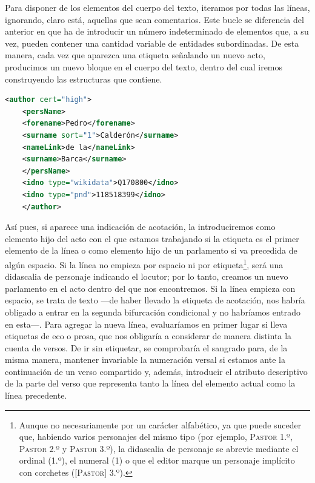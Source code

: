 Para disponer de los elementos del cuerpo del texto, iteramos por todas las líneas, ignorando, claro está, aquellas que sean comentarios. Este bucle se diferencia del anterior en que ha de introducir un número indeterminado de elementos que, a su vez, pueden contener una cantidad variable de entidades subordinadas. De esta manera, cada vez que aparezca una etiqueta señalando un nuevo acto, producimos un nuevo bloque en el cuerpo del texto, dentro del cual iremos construyendo las estructuras que contiene.

\begin{lstlisting}[frame=none,numbers=none,caption={Formato de autores.},language=xml, label={list:authorsxml}]
	<author cert="high">
	<persName>
	<forename>Pedro</forename>
	<surname sort="1">Calderón</surname>
	<nameLink>de la</nameLink>
	<surname>Barca</surname>
	</persName>
	<idno type="wikidata">Q170800</idno>
	<idno type="pnd">118518399</idno>
	</author>
\end{lstlisting}

 Así pues, si aparece una indicación de acotación, la introduciremos como elemento hijo del acto con el que estamos trabajando si la etiqueta es el primer elemento de la línea o como elemento hijo de un parlamento si va precedida de algún espacio. Si la línea no empieza por espacio ni por etiqueta\footnote{Aunque no necesariamente por un carácter alfabético, ya que puede suceder que, habiendo varios personajes del mismo tipo (por ejemplo, \textsc{Pastor 1.º}, \textsc{Pastor 2.º} y \textsc{Pastor 3.º}), la didascalia de personaje se abrevie mediante el ordinal (1.º), el numeral (1) o que el editor marque un personaje implícito con corchetes ([\textsc{Pastor] 3.º}).}, será una didascalia de personaje indicando el locutor; por lo tanto, creamos un nuevo parlamento en el acto dentro del que nos encontremos. Si la línea empieza con espacio, se trata de texto —de haber llevado la etiqueta de acotación, nos habría obligado a entrar en la segunda bifurcación condicional y no habríamos entrado en esta—. Para agregar la nueva línea, evaluaríamos en primer lugar si lleva etiquetas de eco o prosa, que nos obligaría a considerar de manera distinta  la cuenta de versos. De ir sin etiquetar, se comprobaría el sangrado para, de la misma manera, mantener invariable la numeración versal si estamos ante la continuación de un verso compartido y, además, introducir el atributo descriptivo de la parte del verso que representa tanto la línea del elemento actual como la línea precedente.

